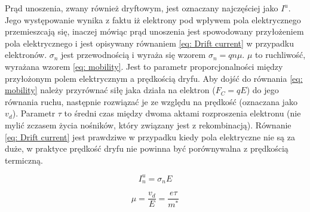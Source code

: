         \noindent Prąd unoszenia, zwany również dryftowym, jest oznaczany najczęściej jako $I^u$. Jego występowanie wynika z faktu iż elektrony pod wpływem pola elektrycznego przemieszcają się, inaczej mówiąc prąd unoszenia jest spowodowany przyłożeniem pola elektrycznego i jest opisywany równaniem \ref{eq: Drift current} w przypadku elektronów. $\sigma_n$ jest przewodnością i wyraża się wzorem $\sigma_n = qn\mu$. $\mu$ to ruchliwość, wyrażana wzorem \ref{eq: mobility}. Jest to parametr proporcjonalności między przyłożonym polem elektrycznym a prędkością dryfu. Aby dojść do równania \ref{eq: mobility} należy przyrównać siłę jaka działa na elektron ($F_C = qE$) do jego równania ruchu, następnie rozwiązać je ze względu na prędkość (oznaczana jako $v_d$). Parametr $\tau$ to średni czas między dwoma aktami rozproszenia elektronu (nie mylić zczasem życia nośników, który związany jest z rekombinacją). Równanie \ref{eq: Drift current} jest prawdziwe w przypadku kiedy pola elektryczne nie są za duże, w praktyce prędkość dryfu nie powinna być porównywalna z prędkością termiczną. 
        \newline
        \begin{minipage}[l]{0.49\textwidth}
            \centering
            \begin{equation}
                I^u_n = \sigma_n E \label{eq: Drift current}
            \end{equation}
        \end{minipage}
        \hfill
        \begin{minipage}[r]{0.49\textwidth}
            \centering
            \begin{equation}
                \mu = \frac{v_d}{E} = \frac{e \tau}{m^*}\label{eq: mobility}
            \end{equation}
        \end{minipage}
        
